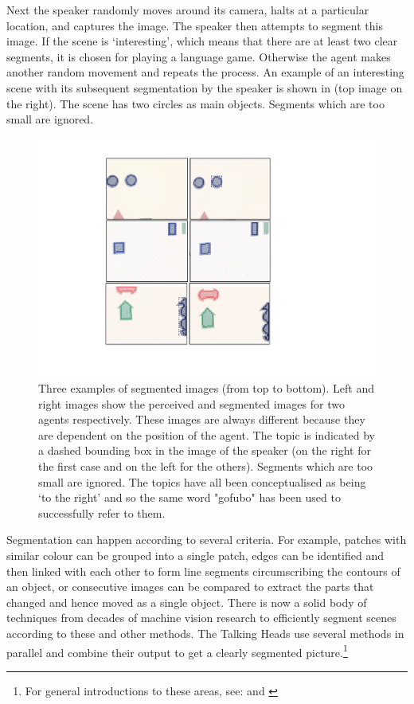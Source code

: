 Next the speaker randomly moves around its camera, halts 
at a particular location, and captures
the image. The speaker then attempts to segment 
this image. If the scene is `interesting', which means that
there are at least two clear segments, it is chosen 
for playing a language game. Otherwise the agent makes another 
random movement and repeats the process. An example of 
an interesting scene with its subsequent segmentation
by the speaker is shown in  (top image on the right). The scene
has two circles as main objects. Segments which are too 
small are ignored. 

\begin{figure}[htbp]
  \centerline{\includegraphics[width=.60\textwidth]{chap2/figs/hpos}}
\caption{ Three examples of segmented images (from top to bottom). Left and right images 
show the perceived and segmented images for two agents respectively. These images are always
different because they are dependent on the position of the agent. 
The topic is indicated by a dashed bounding box in the 
image of the speaker (on the right for the first case and on the left for the others). 
Segments which are too small are ignored. The topics have all been conceptualised
as being `to the right' and so the same word 
"gofubo" has been used to successfully refer to them.}
\label{f:plate10}
\end{figure}

Segmentation can happen according to several criteria. 
For example, patches with similar colour can be grouped 
into a single patch, edges can be identified 
and then linked with each other to form line segments
circumscribing the contours of 
an object, or consecutive images can be compared to extract the parts
that changed and hence moved as a single object. 
There is now a solid body of techniques from decades
of machine vision research to efficiently segment scenes according to 
these and other methods. The Talking Heads use several methods
in parallel and combine their output to get a clearly segmented
picture.\footnote{
For general introductions to these areas, 
see: \cite{Ballard:1982} and \cite{Fischler:1987}}

